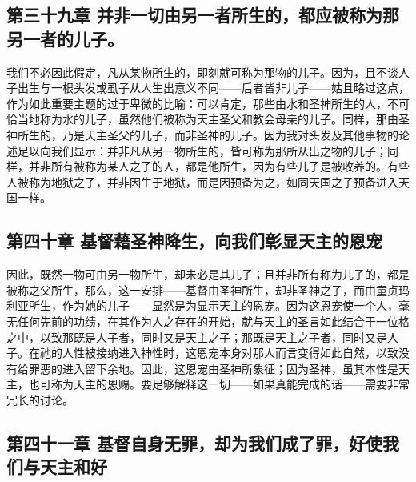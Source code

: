 
\subsection{第三十九章 并非一切由另一者所生的，都应被称为那另一者的儿子。}

我们不必因此假定，凡从某物所生的，即刻就可称为那物的儿子。因为，且不谈人子出生与一根头发或虱子从人生出意义不同——后者皆非儿子——姑且略过这点，作为如此重要主题的过于卑微的比喻：可以肯定，那些由水和圣神所生的人，不可恰当地称为水的儿子，虽然他们被称为天主圣父和教会母亲的儿子。同样，那由圣神所生的，乃是天主圣父的儿子，而非圣神的儿子。因为我对头发及其他事物的论述足以向我们显示：并非凡从另一物所生的，皆可称为那所从出之物的儿子；同样，并非所有被称为某人之子的人，都是他所生，因为有些儿子是被收养的。有些人被称为地狱之子，并非因生于地狱，而是因预备为之，如同天国之子预备进入天国一样。\par


\subsection{第四十章 基督藉圣神降生，向我们彰显天主的恩宠}

因此，既然一物可由另一物所生，却未必是其儿子；且并非所有称为儿子的，都是被称之父所生，那么，这一安排——基督由圣神所生，却非圣神之子，而由童贞玛利亚所生，作为她的儿子——显然是为显示天主的恩宠。因为这恩宠使一个人，毫无任何先前的功绩，在其作为人之存在的开始，就与天主的圣言如此结合于一位格之中，以致那既是人子者，同时又是天主之子；那既是天主之子者，同时又是人子。在祂的人性被接纳进入神性时，这恩宠本身对那人而言变得如此自然，以致没有给罪恶的进入留下余地。因此，这恩宠由圣神所象征；因为圣神，虽其本性是天主，也可称为天主的恩赐。要足够解释这一切——如果真能完成的话——需要非常冗长的讨论。\par


\subsection{第四十一章 基督自身无罪，却为我们成了罪，好使我们与天主和好}

